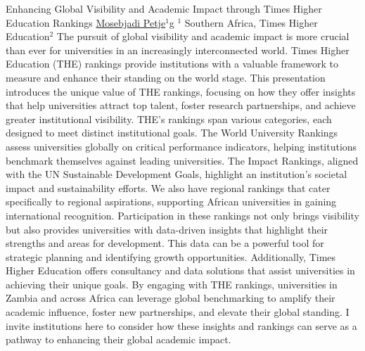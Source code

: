 
    \begin{abstract_online}{Enhancing Global Visibility and Academic Impact through Times Higher Education
Rankings}{%
        \underline{Mosebjadi Petje}}$^{1}$g{%
        }{%
        $^1$  Southern Africa, Times Higher Education}\newline{}$^2$ The pursuit of global visibility and academic impact is more crucial than ever for universities
in an increasingly interconnected world. Times Higher Education (THE) rankings provide
institutions with a valuable framework to measure and enhance their standing on the world
stage. This presentation introduces the unique value of THE rankings, focusing on how they
offer insights that help universities attract top talent, foster research partnerships, and achieve
greater institutional visibility.
THE’s rankings span various categories, each designed to meet distinct institutional goals.
The World University Rankings assess universities globally on critical performance
indicators, helping institutions benchmark themselves against leading universities. The
Impact Rankings, aligned with the UN Sustainable Development Goals, highlight
an institution’s societal impact and sustainability efforts. We also have regional rankings that
cater specifically to regional aspirations, supporting African universities in gaining
international recognition.
Participation in these rankings not only brings visibility but also provides universities with
data-driven insights that highlight their strengths and areas for development. This data can be
a powerful tool for strategic planning and identifying growth opportunities. Additionally,
Times Higher Education offers consultancy and data solutions that assist universities in
achieving their unique goals.
By engaging with THE rankings, universities in Zambia and across Africa can leverage
global benchmarking to amplify their academic influence, foster new partnerships, and
elevate their global standing. I invite institutions here to consider how these insights and
rankings can serve as a pathway to enhancing their global academic impact.
    
    \end{abstract_online}
    
